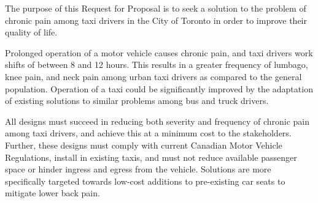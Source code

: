 The purpose of this Request for Proposal is to seek a solution to the
problem of chronic pain among taxi drivers in the City of Toronto in
order to improve their quality of life.

Prolonged operation of a motor vehicle causes chronic pain, and taxi
drivers work shifts of between 8 and 12 hours. This results in a
greater frequency of lumbago, knee pain, and neck pain among urban
taxi drivers as compared to the general population. Operation of a
taxi could be significantly improved by the adaptation of existing
solutions to similar problems among bus and truck drivers.

All designs must succeed in reducing both severity and frequency of
chronic pain among taxi drivers, and achieve this at a minimum cost to
the stakeholders. Further, these designs must comply with current
Canadian Motor Vehicle Regulations, install in existing taxis, and
must not reduce available passenger space or hinder ingress and
egress from the vehicle. Solutions are more specifically targeted
towards low-cost additions to pre-existing car seats to mitigate lower
back pain.
